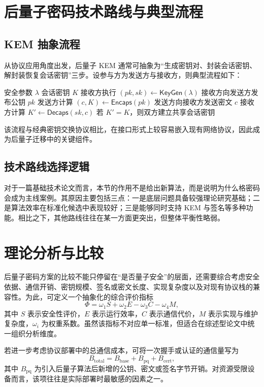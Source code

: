 ﻿\documentclass[12pt,a4paper]{ctexart}
\numberwithin{equation}{section}
\begin{document}
\section{后量子密码技术路线与典型流程}
\subsection{KEM 抽象流程}
从协议应用角度出发，后量子 KEM 通常可抽象为“生成密钥对、封装会话密钥、解封装恢复会话密钥”三步。设参与方为发送方与接收方，则典型流程如下：
\begin{algorithm}[H]
\caption{后量子 KEM 的基本流程}
\begin{algorithmic}[1]
\Require 安全参数 $\lambda$
\Ensure 会话密钥 $K$
\State 接收方执行 $(pk,sk)\leftarrow \mathsf{KeyGen}(\lambda)$
\State 接收方向发送方发布公钥 $pk$
\State 发送方计算 $(c,K)\leftarrow \mathsf{Encaps}(pk)$
\State 发送方向接收方发送密文 $c$
\State 接收方计算 $K' \leftarrow \mathsf{Decaps}(sk,c)$
\State 若 $K'=K$，则双方建立共享会话密钥
\end{algorithmic}
\end{algorithm}
该流程与经典密钥交换协议相比，在接口形式上较容易嵌入现有网络协议，因此成为后量子迁移中的关键组件。

\subsection{技术路线选择逻辑}
对于一篇基础技术论文而言，本节的作用不是给出新算法，而是说明为什么格密码会成为主线案例。其原因主要包括三点：一是底层问题具备较强理论研究基础；二是算法效率在标准化候选中表现较好；三是能够同时支持 KEM 与签名等多种功能。相比之下，其他路线往往在某一方面更突出，但整体平衡性略弱。

\section{理论分析与比较}
后量子密码方案的比较不能只停留在“是否量子安全”的层面，还需要综合考虑安全依据、通信开销、密钥规模、签名或密文长度、实现复杂度以及对现有协议栈的兼容性。为此，可定义一个抽象化的综合评价指标
\begin{equation}
    \Phi = \omega_1 S + \omega_2 E - \omega_3 C - \omega_4 M,
\end{equation}
其中 $S$ 表示安全性评价，$E$ 表示运行效率，$C$ 表示通信代价，$M$ 表示实现与维护复杂度，$\omega_i$ 为权重系数。虽然该指标不对应单一标准，但适合在综述型论文中统一组织分析维度。

若进一步考虑协议部署中的总通信成本，可将一次握手或认证的通信量写为
\begin{equation}
    B_{\mathrm{total}} = B_{\mathrm{base}} + B_{\mathrm{pq}} + B_{\mathrm{cert}},
\end{equation}
其中 $B_{\mathrm{pq}}$ 为引入后量子算法后新增的公钥、密文或签名字节开销。对资源受限设备而言，该项往往是实际部署时最敏感的因素之一。
\end{document}
